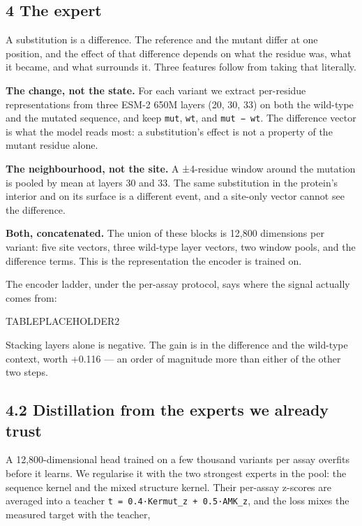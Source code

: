 \hypertarget{the-expert}{%
\subsection{4 The expert}\label{the-expert}}

A substitution is a difference. The reference and the mutant differ at one position, and the effect of
that difference depends on what the residue was, what it became, and what surrounds it. Three features
follow from taking that literally.

\textbf{The change, not the state.} For each variant we extract per-residue representations from three ESM-2
650M layers (20, 30, 33) on both the wild-type and the mutated sequence, and keep \texttt{mut}, \texttt{wt}, and
\texttt{mut\ −\ wt}. The difference vector is what the model reads most: a substitution's effect is not a
property of the mutant residue alone.

\textbf{The neighbourhood, not the site.} A ±4-residue window around the mutation is pooled by mean at layers
30 and 33. The same substitution in the protein's interior and on its surface is a different event, and
a site-only vector cannot see the difference.

\textbf{Both, concatenated.} The union of these blocks is 12,800 dimensions per variant: five site vectors,
three wild-type layer vectors, two window pools, and the difference terms. This is the representation the
encoder is trained on.

The encoder ladder, under the per-assay protocol, says where the signal actually comes from:

TABLEPLACEHOLDER2

Stacking layers alone is negative. The gain is in the difference and the wild-type context, worth
+0.116 --- an order of magnitude more than either of the other two steps.

\hypertarget{distillation-from-the-experts-we-already-trust}{%
\subsection{4.2 Distillation from the experts we already trust}\label{distillation-from-the-experts-we-already-trust}}

A 12,800-dimensional head trained on a few thousand variants per assay overfits before it learns. We
regularise it with the two strongest experts in the pool: the sequence kernel and the mixed structure
kernel. Their per-assay z-scores are averaged into a teacher \texttt{t\ =\ 0.4·Kermut\_z\ +\ 0.5·AMK\_z}, and the
loss mixes the measured target with the teacher,

